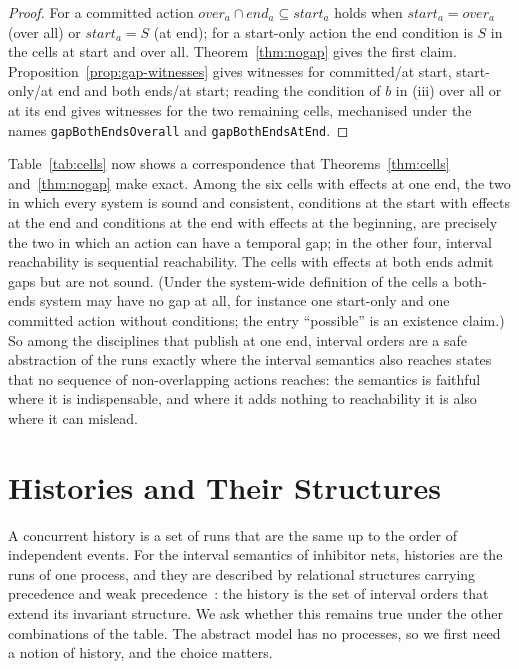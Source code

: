 \documentclass[preprint,12pt]{elsarticle}
\theoremstyle{plain}
\theoremstyle{definition}
\newcommand{\st}{\mathit{start}}
\newcommand{\ovr}{\mathit{over}}
\newcommand{\stp}{\mathit{end}}
\newcommand{\lean}[1]{\texttt{#1}}
\begin{document}
\begin{proof}
For a committed action $\ovr_a \cap \stp_a \subseteq \st_a$ holds when $\st_a = \ovr_a$ (over all) or $\st_a = S$ (at end); for a start-only action the end condition is $S$ in the cells at start and over all. Theorem~\ref{thm:nogap} gives the first claim. Proposition~\ref{prop:gap-witnesses} gives witnesses for committed/at start, start-only/at end and both ends/at start; reading the condition of $b$ in (iii) over all or at its end gives witnesses for the two remaining cells, mechanised under the names \lean{gapBothEndsOverall} and \lean{gapBothEndsAtEnd}.
\end{proof}

Table~\ref{tab:cells} now shows a correspondence that Theorems~\ref{thm:cells} and~\ref{thm:nogap} make exact. Among the six cells with effects at one end, the two in which every system is sound and consistent, conditions at the start with effects at the end and conditions at the end with effects at the beginning, are precisely the two in which an action can have a temporal gap; in the other four, interval reachability is sequential reachability. The cells with effects at both ends admit gaps but are not sound. (Under the system-wide definition of the cells a both-ends system may have no gap at all, for instance one start-only and one committed action without conditions; the entry ``possible'' is an existence claim.) So among the disciplines that publish at one end, interval orders are a safe abstraction of the runs exactly where the interval semantics also reaches states that no sequence of non-overlapping actions reaches: the semantics is faithful where it is indispensable, and where it adds nothing to reachability it is also where it can mislead.

\section{Histories and Their Structures}
\label{sec:structures}

A concurrent history is a set of runs that are the same up to the order of independent events. For the interval semantics of inhibitor nets, histories are the runs of one process, and they are described by relational structures carrying precedence and weak precedence~\cite{JanickiKoutny1993,AlqarniJanicki2018,JanickiKleijnKoutnyMikulski2024}: the history is the set of interval orders that extend its invariant structure. We ask whether this remains true under the other combinations of the table. The abstract model has no processes, so we first need a notion of history, and the choice matters.
\end{document}
